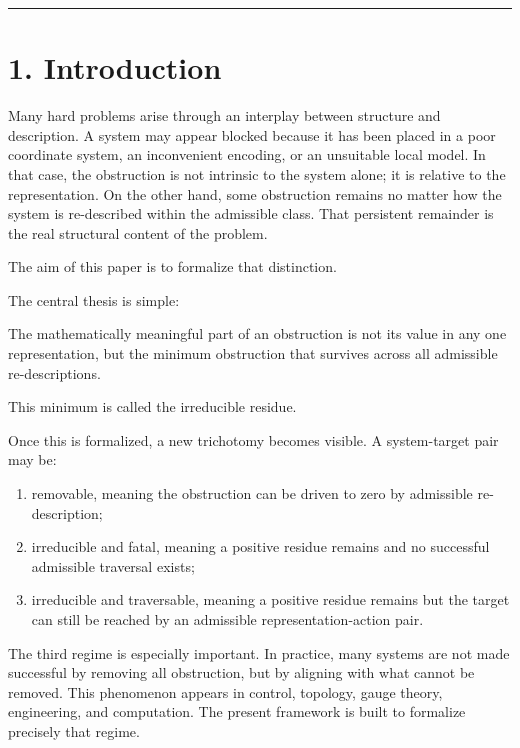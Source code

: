 \documentclass[
]{article}
\providecommand{\tightlist}{%
  \setlength{\itemsep}{0pt}\setlength{\parskip}{0pt}}
\begin{document}
\begin{center}\rule{0.5\linewidth}{0.5pt}\end{center}

\section{1. Introduction}\label{introduction}

Many hard problems arise through an interplay between structure and
description. A system may appear blocked because it has been placed in a
poor coordinate system, an inconvenient encoding, or an unsuitable local
model. In that case, the obstruction is not intrinsic to the system
alone; it is relative to the representation. On the other hand, some
obstruction remains no matter how the system is re-described within the
admissible class. That persistent remainder is the real structural
content of the problem.

The aim of this paper is to formalize that distinction.

The central thesis is simple:

The mathematically meaningful part of an obstruction is not its value in
any one representation, but the minimum obstruction that survives across
all admissible re-descriptions.

This minimum is called the irreducible residue.

Once this is formalized, a new trichotomy becomes visible. A
system-target pair may be:

\begin{enumerate}
\def\labelenumi{\arabic{enumi}.}
\tightlist
\item
  removable, meaning the obstruction can be driven to zero by admissible
  re-description;
\item
  irreducible and fatal, meaning a positive residue remains and no
  successful admissible traversal exists;
\item
  irreducible and traversable, meaning a positive residue remains but
  the target can still be reached by an admissible representation-action
  pair.
\end{enumerate}

The third regime is especially important. In practice, many systems are
not made successful by removing all obstruction, but by aligning with
what cannot be removed. This phenomenon appears in control, topology,
gauge theory, engineering, and computation. The present framework is
built to formalize precisely that regime.
\end{document}
